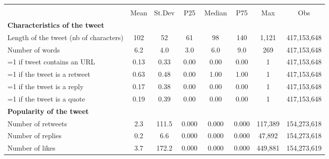 {
\def\sym#1{\ifmmode^{#1}\else\(^{#1}\)\fi}
\begin{tabular}{l*{1}{ccccccc}}
\hline\hline
                    &\multicolumn{7}{c}{}                                                                      \\
                    &        Mean&      St.Dev&         P25&      Median&         P75&         Max&         Obs\\
\hline
\textbf{Characteristics of the tweet}&            &            &            &            &            &            &            \\
Length of the tweet (nb of characters)&         102&          52&          61&          98&         140&       1,121& 417,153,648\\
Number of words     &         6.2&         4.0&         3.0&         6.0&         9.0&         269& 417,153,648\\
=1 if tweet contains an URL&        0.13&        0.33&        0.00&        0.00&        0.00&           1& 417,153,648\\
=1 if the tweet is a retweet&        0.63&        0.48&        0.00&        1.00&        1.00&           1& 417,153,648\\
=1 if the tweet is a reply&        0.17&        0.38&        0.00&        0.00&        0.00&           1& 417,153,648\\
=1 if the tweet is a quote&        0.19&        0.39&        0.00&        0.00&        0.00&           1& 417,153,648\\
\textbf{Popularity of the tweet}&            &            &            &            &            &            &            \\
Number of retweets  &         2.3&       111.5&       0.000&       0.000&       0.000&     117,389& 154,273,618\\
Number of replies   &         0.2&         6.6&       0.000&       0.000&       0.000&      47,892& 154,273,618\\
Number of likes     &         3.7&       172.2&       0.000&       0.000&       0.000&     449,881& 154,273,619\\
\hline\hline
\end{tabular}
}
